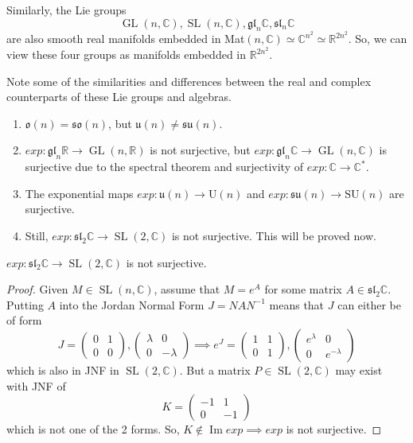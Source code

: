 \documentclass{article}
\DeclareMathOperator{\im}{Im}
\DeclareMathOperator{\GL}{GL}
\DeclareMathOperator{\SL}{SL}
\begin{document}
      Similarly, the Lie groups 
      \begin{equation}
        \GL(n, \mathbb{C}), \SL(n, \mathbb{C}), \mathfrak{gl}_n \mathbb{C}, \mathfrak{sl}_n \mathbb{C}
      \end{equation}
      are also smooth real manifolds embedded in Mat$(n, \mathbb{C}) \simeq \mathbb{C}^{n^2} \simeq \mathbb{R}^{2 n^2}$. So, we can view these four groups as manifolds embedded in $\mathbb{R}^{2 n^2}$. 

      Note some of the similarities and differences between the real and complex counterparts of these Lie groups and algebras. 
      \begin{enumerate}
          \item $\mathfrak{o}(n) = \mathfrak{so}(n)$, but $\mathfrak{u}(n) \neq \mathfrak{su}(n)$. 
          \item $exp: \mathfrak{gl}_n \mathbb{R} \longrightarrow \GL(n, \mathbb{R})$ is not surjective, but $exp: \mathfrak{gl}_n \mathbb{C} \longrightarrow \GL(n, \mathbb{C})$ is surjective due to the spectral theorem and surjectivity of $exp: \mathbb{C} \longrightarrow \mathbb{C}^*$.
          \item The exponential maps $exp: \mathfrak{u}(n) \longrightarrow \text{U}(n)$ and $exp: \mathfrak{su}(n) \longrightarrow \text{SU}(n)$ are surjective. 
          \item Still, $exp: \mathfrak{sl}_2 \mathbb{C} \longrightarrow \SL(2, \mathbb{C})$ is not surjective. This will be proved now. 
      \end{enumerate}

      \begin{theorem}
      $exp: \mathfrak{sl}_2 \mathbb{C} \longrightarrow \SL(2, \mathbb{C})$ is not surjective. 
      \end{theorem}
      \begin{proof}
      Given $M \in \SL(n, \mathbb{C})$, assume that $M = e^A$ for some matrix $A \in \mathfrak{sl}_2 \mathbb{C}$. Putting $A$ into the Jordan Normal Form $J = N A N^{-1}$ means that $J$ can either be of form
      \[J = \begin{pmatrix}
      0&1\\0&0
      \end{pmatrix}, \begin{pmatrix}
      \lambda&0\\0&-\lambda
      \end{pmatrix} \implies e^J = \begin{pmatrix}
      1&1\\0&1
      \end{pmatrix}, \begin{pmatrix}
      e^\lambda&0\\0&e^{-\lambda}
      \end{pmatrix}\]
      which is also in JNF in $\SL(2, \mathbb{C})$. But a matrix $P \in \SL(2, \mathbb{C})$ may exist with JNF of 
      \[K = \begin{pmatrix}
      -1&1\\0&-1
      \end{pmatrix}\]
      which is not one of the 2 forms. So, $K \not\in \im{exp} \implies exp$ is not surjective. 
      \end{proof}
\end{document}
